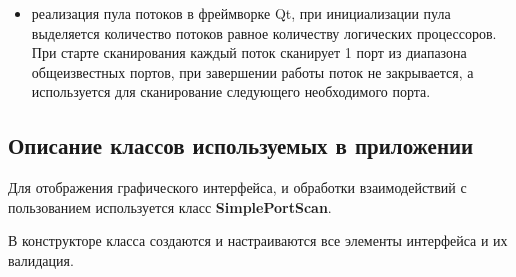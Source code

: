 \begin{itemize}
\tightlist
\item
  реализация пула потоков в фреймворке Qt, при инициализации пула
  выделяется количество потоков равное количеству логических
  процессоров. При старте сканирования каждый поток сканирует 1 порт из
  диапазона общеизвестных портов, при завершении работы поток не
  закрывается, а используется для сканирование следующего необходимого
  порта.
\end{itemize}

\hypertarget{ux43eux43fux438ux441ux430ux43dux438ux435-ux43aux43bux430ux441ux441ux43eux432-ux438ux441ux43fux43eux43bux44cux437ux443ux435ux43cux44bux445-ux432-ux43fux440ux438ux43bux43eux436ux435ux43dux438ux438}{%
\subsection{Описание классов используемых в
приложении}\label{ux43eux43fux438ux441ux430ux43dux438ux435-ux43aux43bux430ux441ux441ux43eux432-ux438ux441ux43fux43eux43bux44cux437ux443ux435ux43cux44bux445-ux432-ux43fux440ux438ux43bux43eux436ux435ux43dux438ux438}}

Для отображения графического интерфейса, и обработки взаимодействий с
пользованием используется класс \textbf{SimplePortScan}.

В конструкторе класса создаются и настраиваются все элементы интерфейса
и их валидация.

\begin{Shaded}
\begin{Highlighting}[]
     \NormalTok{(}\SpecialCharTok{\textbackslash{}\textbackslash{}}\NormalTok{);}
     
\NormalTok{);}
\NormalTok{);}
\end{Highlighting}
\end{Shaded}

